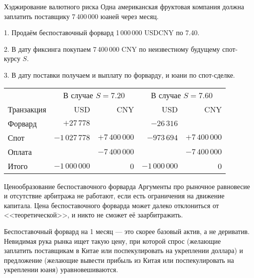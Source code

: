 \documentclass{beamer}
\begin{document}
\begin{frame}{Хэджирование валютного риска}
\justify
Одна американская фруктовая компания должна заплатить поставщику 7\,400\,000 юаней через месяц.

1. Продаём беспоставочный форвард 1\,000\,000 USDCNY по 7.40.

2. В дату фиксинга покупаем 7\,400\,000 CNY по неизвестному будущему спот-курсу $S$.

3. В дату поставки получаем и выплату по форварду, и юани по спот-сделке.

\justify
\centering
\small
\begin{tabular}{l|r|r|r|r}
& \multicolumn{2}{c|}{В случае $S=7.20$} & \multicolumn{2}{c}{В случае $S=7.60$} \\ \cline{2-5}
Транзакция & USD & CNY & USD & CNY \\ \hline
Форвард & $+27\,778$ &  &  $-26\,316$& \\
Спот & $-1\,027\,778$ & $+7\,400\,000$ & $-973\,694$ & $+7\,400\,000$ \\
Оплата & & $-7\,400\,000$ & & $-7\,400\,000$ \\ \hline
Итого & $-1\,000\,000$ & 0 & $-1\,000\,000$ & 0
\end{tabular}\end{frame}



\begin{frame}{Ценообразование беспоставочного форварда}
\justify
Аргументы про рыночное равновесие и отсутствие арбитража не работают, если есть ограничения на движение капитала. Цена беспоставочного форварда может далеко отклониться от <<теоретической>>, и никто не сможет её заарбитражить.

\justify
Беспоставочный форвард на 1 месяц --- это скорее базовый актив, а не дериватив. Невидимая рука рынка ищет такую цену, при которой спрос (желающие заплатить поставщикам в Китае или поспекулировать на укреплении доллара) и предложение (желающие вывести прибыль из Китая или поспекулировать на укреплении юаня) уравновешиваются.
\end{frame}
\end{document}
